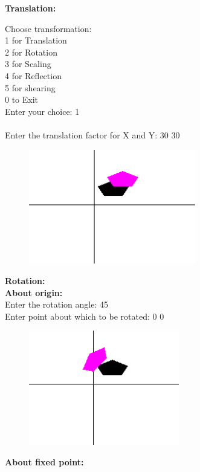 \documentclass[9pt,letterpaper]{article}
\begin{document}
\newpage
\textbf{\large{Translation:}}

Choose transformation: \\
1 for Translation\\
2 for Rotation\\
3 for Scaling\\
4 for Reflection\\
5 for shearing\\
0 to Exit\\
Enter your choice: 1\\
\\
Enter the translation factor for X and Y: 30 30\\
\begin{figure}[h]
    \centering
    \includegraphics[height=5cm]{Outputs/OP2.png}
\end{figure}

\newpage
\textbf{\large{Rotation: }}\\
\textbf{About origin:}\\

Enter the rotation angle: 45\\
Enter point about which to be rotated: 0 0\\

\begin{figure}[h]
    \centering
    \includegraphics[height=5cm]{Outputs/OP3.png}
\end{figure}

\textbf{About fixed point:}\\
\end{document}
